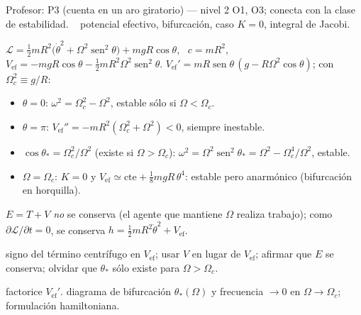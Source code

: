 \documentclass[spanish]{beamer}
\newcommand{\Vef}{V_{\mathrm{ef}}}
\begin{document}
\begin{frame}{Profesor: P3 (cuenta en un aro giratorio) --- nivel 2}
\scriptsize
{} O1, O3; conecta con la clase de estabilidad. \  potencial efectivo, bifurcación, caso $K=0$, integral de Jacobi.

 $\mathcal{L}=\tfrac12mR^2\big(\dot\theta^2+\Omega^2\operatorname{sen}^2\theta\big)+mgR\cos\theta$, \ $c=mR^2$, \ $\Vef=-mgR\cos\theta-\tfrac12mR^2\Omega^2\operatorname{sen}^2\theta$.
$\Vef'=mR\operatorname{sen}\theta\,(g-R\Omega^2\cos\theta)$; con $\Omega_c^2\equiv g/R$:
\begin{itemize}
\item $\theta=0$: $\omega^2=\Omega_c^2-\Omega^2$, estable sólo si $\Omega<\Omega_c$.
\item $\theta=\pi$: $\Vef''=-mR^2(\Omega_c^2+\Omega^2)<0$, siempre inestable.
\item $\cos\theta_*=\Omega_c^2/\Omega^2$ (existe si $\Omega>\Omega_c$): $\omega^2=\Omega^2\operatorname{sen}^2\theta_*=\Omega^2-\Omega_c^4/\Omega^2$, estable.
\item $\Omega=\Omega_c$: $K=0$ y $\Vef\simeq\text{cte}+\tfrac18mgR\,\theta^4$: estable pero anarmónico (bifurcación en horquilla).
\end{itemize}
$E=T+V$ \emph{no} se conserva (el agente que mantiene $\Omega$ realiza trabajo); como $\partial\mathcal{L}/\partial t=0$, se conserva $h=\tfrac12mR^2\dot\theta^2+\Vef$.

 signo del término centrífugo en $\Vef$; usar $V$ en lugar de $\Vef$; afirmar que $E$ se conserva; olvidar que $\theta_*$ sólo existe para $\Omega>\Omega_c$.

 factorice $\Vef'$. \quad {} diagrama de bifurcación $\theta_*(\Omega)$ y frecuencia $\to0$ en $\Omega\to\Omega_c$; formulación hamiltoniana.
\end{frame}
\end{document}
